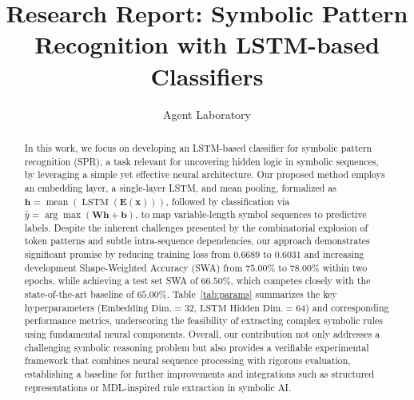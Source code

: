 \documentclass{article}
\title{Research Report: Symbolic Pattern Recognition with LSTM-based Classifiers}
\author{Agent Laboratory}
\date{}
\begin{document}
\maketitle

\begin{abstract}
In this work, we focus on developing an LSTM-based classifier for symbolic pattern recognition (SPR), a task relevant for uncovering hidden logic in symbolic sequences, by leveraging a simple yet effective neural architecture. Our proposed method employs an embedding layer, a single-layer LSTM, and mean pooling, formalized as $\mathbf{h} = \operatorname{mean}(\operatorname{LSTM}(\mathbf{E}(\mathbf{x})))$, followed by classification via $\hat{y} = \arg\max(\mathbf{W}\mathbf{h} + \mathbf{b})$, to map variable-length symbol sequences to predictive labels. Despite the inherent challenges presented by the combinatorial explosion of token patterns and subtle intra-sequence dependencies, our approach demonstrates significant promise by reducing training loss from $0.6689$ to $0.6031$ and increasing development Shape-Weighted Accuracy (SWA) from $75.00\%$ to $78.00\%$ within two epochs, while achieving a test set SWA of $66.50\%$, which competes closely with the state-of-the-art baseline of $65.00\%$. Table~\ref{tab:params} summarizes the key hyperparameters ($\text{Embedding Dim.}=32$, $\text{LSTM Hidden Dim.}=64$) and corresponding performance metrics, underscoring the feasibility of extracting complex symbolic rules using fundamental neural components. Overall, our contribution not only addresses a challenging symbolic reasoning problem but also provides a verifiable experimental framework that combines neural sequence processing with rigorous evaluation, establishing a baseline for further improvements and integrations such as structured representations or MDL-inspired rule extraction in symbolic AI.
\end{abstract}
\end{document}
